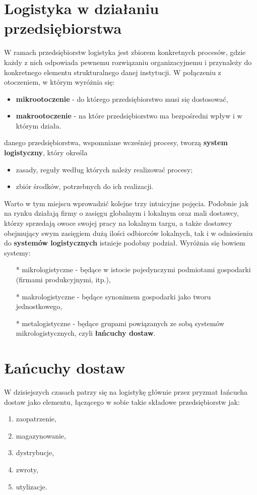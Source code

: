 \section{Logistyka w działaniu przedsiębiorstwa}  
	W ramach przedsiębiorstw logistyka jest zbiorem konkretnych procesów, 
	gdzie każdy z nich odpowiada pewnemu rozwiązaniu organizacyjnemu i przynależy do konkretnego 
	elementu strukturalnego danej instytucji. W połączeniu z otoczeniem, w którym wyróżnia się:
	\begin{itemize}
		\item \textbf{mikrootoczenie} - do którego przedsiębiorstwo musi się dostosować,
		\item \textbf{makrootoczenie} - na które przedsiębiorstwo ma bezpośredni wpływ i w którym działa.
	\end{itemize}
	danego przedsiębiorstwa, wspomniane wcześniej procesy, tworzą \textbf{system logistyczny}, który określa
	\begin{itemize}
		\item zasady, reguły według których należy realizować procesy;
		\item zbiór środków, potrzebnych do ich realizacji.
	\end{itemize}
	Warto w tym miejscu wprowadzić kolejne trzy intuicyjne pojęcia. Podobnie jak na rynku
	działają firmy o zasięgu globalnym i lokalnym oraz mali dostawcy, którzy sprzedają
	owoce swojej pracy na lokalnym targu, a także dostawcy obejmujący swym zasięgiem dużą ilości
	odbiorców lokalnych, tak i w odniesieniu do \textbf{systemów logistycznych}
	istnieje podobny podział. Wyróżnia się bowiem systemy:
	\begin{itemize}
		\item[*] mikrologistyczne 	- będące w istocie pojedynczymi podmiotami gospodarki (firmami produkcyjnymi, itp.),
		\item[*] makrologistyczne 	- będące synonimem gospodarki jako tworu jednostkowego,
		\item[*] metalogistyczne	- będące grupami powiązanych ze sobą systemów mikrologistycznych, 
		czyli \textbf{łańcuchy dostaw}\cite{systemy_logistyczne_podstawy_funkcjonowania}.
	\end{itemize}

\section{Łańcuchy dostaw}\label{c2:supply_chains}
	W dzisiejszych czasach patrzy się na logistykę 
	głównie przez pryzmat łańcucha dostaw jako
	elementu, łączącego w sobie takie składowe przedsiębiorstw jak:
	\begin{enumerate}
		\item zaopatrzenie,
		\item magazynowanie,
		\item dystrybucje,
		\item zwroty,
		\item utylizacje.
	\end{enumerate}
	
